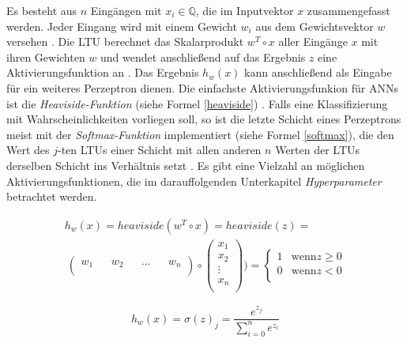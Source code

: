 Es besteht aus $n$ Eingängen mit $x_{i} \in \mathbb{Q}$, die im Inputvektor $x$ zusammengefasst werden. Jeder Eingang wird mit einem Gewicht $w_{i}$ aus dem Gewichtsvektor $w$ versehen \cite[S. 257 f.]{AurelienGeron.2018}. Die LTU berechnet das Skalarprodukt $w^{T} \circ x$ aller Eingänge $x$ mit ihren Gewichten $w$ und wendet anschließend auf das Ergebnis $z$ eine Aktivierungsfunktion an \cite[S. 257 f.]{AurelienGeron.2018}. Das Ergebnis $h_{w}(x)$ kann anschließend als Eingabe für ein weiteres Perzeptron dienen. Die einfachste Aktivierungsfunkion für ANNs ist die \textit{Heaviside-Funktion} (siehe Formel \ref{heaviside}) \cite[S. 258 ff.]{AurelienGeron.2018}. Falls eine Klassifizierung mit Wahrscheinlichkeiten vorliegen soll, so ist die letzte Schicht eines Perzeptrons meist mit der \textit{Softmax-Funktion} implementiert (siehe Formel \ref{softmax}), die den Wert des $j$-ten LTUs einer Schicht mit allen anderen $n$ Werten der LTUs derselben Schicht ins Verhältnis setzt \cite[S. 140 ff.]{AurelienGeron.2018}. Es gibt eine Vielzahl an möglichen Aktivierungsfunktionen, die im darauffolgenden Unterkapitel \textit{Hyperparameter} betrachtet werden.

\begin{equation} \label{heaviside}
\begin{split}
h_{w}(x) = heaviside(w^{T} \circ x) = heaviside(z) = \\\ \begin{pmatrix} 
w_{1}&&w_{2}&&\dots&& w_{n}\\ 
\end{pmatrix} 
\circ 
\begin{pmatrix} x_{1}\\
x_{2}\\
\vdots\\
x_{n}\\
\end{pmatrix}) = 
\begin{cases}
1 & \text{wenn} z \geq 0 \\
0 & \text{wenn} z < 0 \\
\end{cases}
\end{split}
\end{equation}

\begin{equation} \label{softmax}
h_{w}(x) = \sigma(z)_j = \frac{e^{z_j}}{\sum_{i=0}^n e^{z_i} }
\end{equation}

